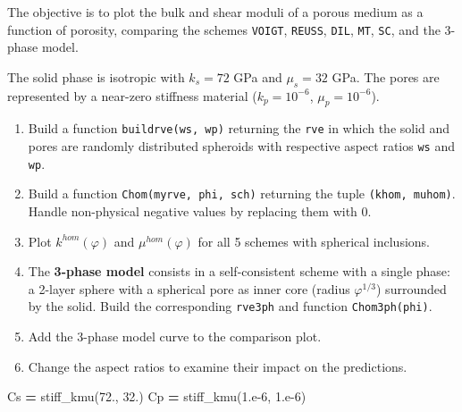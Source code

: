 \documentclass[
  a4paper,
  numbers=noendperiod,
  DIV=12]{scrreprt}
\newenvironment{Shaded}{\begin{snugshade}}{\end{snugshade}}
\newcommand{\FloatTok}[1]{\textcolor[rgb]{0.00,0.00,0.81}{#1}}
\newcommand{\NormalTok}[1]{#1}
\newcommand{\OperatorTok}[1]{\textcolor[rgb]{0.81,0.36,0.00}{\textbf{#1}}}
\begin{document}
\begin{tcolorbox}[enhanced jigsaw, arc=.35mm, bottomrule=.15mm, bottomtitle=1mm, breakable, colback=white, colbacktitle=quarto-callout-caution-color!10!white, colframe=quarto-callout-caution-color-frame, coltitle=black, left=2mm, leftrule=.75mm, opacityback=0, opacitybacktitle=0.6, rightrule=.15mm, title={Exercise}, titlerule=0mm, toprule=.15mm, toptitle=1mm]

The objective is to plot the bulk and shear moduli of a porous medium as
a function of porosity, comparing the schemes \texttt{VOIGT},
\texttt{REUSS}, \texttt{DIL}, \texttt{MT}, \texttt{SC}, and the 3-phase
model.

The solid phase is isotropic with \(k_s=72\) GPa and \(\mu_s=32\) GPa.
The pores are represented by a near-zero stiffness material
(\(k_p=10^{-6}\), \(\mu_p=10^{-6}\)).

\begin{enumerate}
\def\labelenumi{\arabic{enumi}.}
\item
  Build a function \texttt{buildrve(ws,\ wp)} returning the \texttt{rve}
  in which the solid and pores are randomly distributed spheroids with
  respective aspect ratios \texttt{ws} and \texttt{wp}.
\item
  Build a function \texttt{Chom(myrve,\ phi,\ sch)} returning the tuple
  \texttt{(khom,\ muhom)}. Handle non-physical negative values by
  replacing them with 0.
\item
  Plot \(k^{hom}(\varphi)\) and \(\mu^{hom}(\varphi)\) for all 5 schemes
  with spherical inclusions.
\item
  The \textbf{3-phase model} consists in a self-consistent scheme with a
  single phase: a 2-layer sphere with a spherical pore as inner core
  (radius \(\varphi^{1/3}\)) surrounded by the solid. Build the
  corresponding \texttt{rve3ph} and function \texttt{Chom3ph(phi)}.
\item
  Add the 3-phase model curve to the comparison plot.
\item
  Change the aspect ratios to examine their impact on the predictions.
\end{enumerate}

\begin{Shaded}
\begin{Highlighting}[]
\NormalTok{Cs }\OperatorTok{=}\NormalTok{ stiff\_kmu(}\FloatTok{72.}\NormalTok{, }\FloatTok{32.}\NormalTok{)}
\NormalTok{Cp }\OperatorTok{=}\NormalTok{ stiff\_kmu(}\FloatTok{1.e{-}6}\NormalTok{, }\FloatTok{1.e{-}6}\NormalTok{)}


\end{Highlighting}
\end{Shaded}
\end{tcolorbox}
\end{document}
